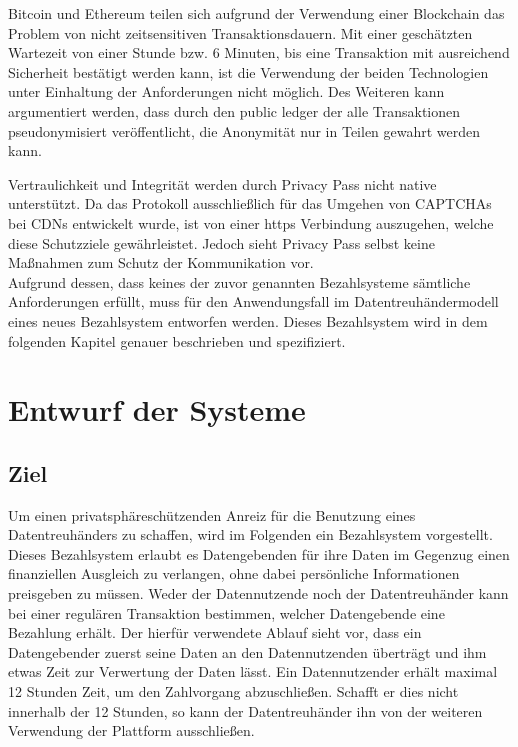 \documentclass[11pt,a4paper]{scrreprt}
\begin{document}
Bitcoin und Ethereum teilen sich aufgrund der Verwendung einer Blockchain das Problem von nicht zeitsensitiven Transaktionsdauern. Mit einer geschätzten Wartezeit von einer Stunde bzw. 6 Minuten, bis eine Transaktion mit ausreichend Sicherheit bestätigt werden kann, ist die Verwendung der beiden Technologien unter Einhaltung der Anforderungen nicht möglich. Des Weiteren kann argumentiert werden, dass durch den public ledger der alle Transaktionen pseudonymisiert veröffentlicht, die Anonymität nur in Teilen gewahrt werden kann. 

Vertraulichkeit und Integrität werden durch Privacy Pass nicht native unterstützt. Da das Protokoll ausschließlich für das Umgehen von CAPTCHAs bei CDNs entwickelt wurde, ist von einer https Verbindung auszugehen, welche diese Schutzziele gewährleistet. Jedoch sieht Privacy Pass selbst keine Maßnahmen zum Schutz der Kommunikation vor.\\

Aufgrund dessen, dass keines der zuvor genannten Bezahlsysteme sämtliche Anforderungen erfüllt, muss für den Anwendungsfall im Datentreuhändermodell eines neues Bezahlsystem entworfen werden. Dieses Bezahlsystem wird in dem folgenden Kapitel genauer beschrieben und spezifiziert. 





\chapter{Entwurf der Systeme}
\label{chap:systems}





\section{Ziel}
\label{sec:mainPart_ziel}
Um einen privatsphäreschützenden Anreiz für die Benutzung eines Datentreuhänders zu schaffen, wird im Folgenden ein Bezahlsystem vorgestellt. Dieses Bezahlsystem erlaubt es Datengebenden für ihre Daten im Gegenzug einen finanziellen Ausgleich zu verlangen, ohne dabei persönliche Informationen preisgeben zu müssen. Weder der Datennutzende noch der Datentreuhänder kann bei einer regulären Transaktion bestimmen, welcher Datengebende eine Bezahlung erhält. Der hierfür verwendete Ablauf sieht vor, dass ein Datengebender zuerst seine Daten an den Datennutzenden überträgt und ihm etwas Zeit zur Verwertung der Daten lässt. Ein Datennutzender erhält maximal 12 Stunden Zeit, um den Zahlvorgang abzuschließen. Schafft er dies nicht innerhalb der 12 Stunden, so kann der Datentreuhänder ihn von der weiteren Verwendung der Plattform ausschließen. 
\end{document}
